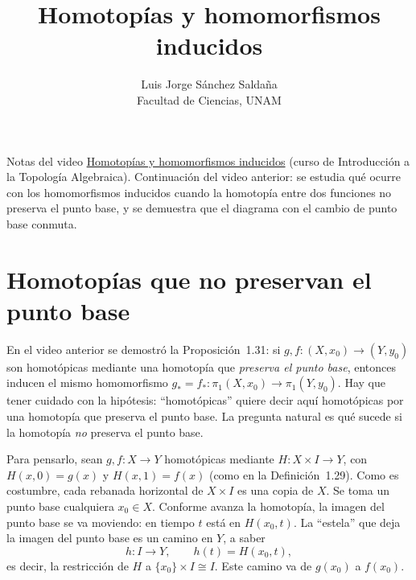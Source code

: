 \documentclass[11pt]{article}
\title{Homotopías y homomorfismos inducidos}
\author{Luis Jorge Sánchez Saldaña\\[2pt]\small Facultad de Ciencias, UNAM}
\date{}
\begin{document}
\maketitle

\noindent\small Notas del video
\href{https://www.youtube.com/watch?v=CPTGHDZAJFc}{\guillemotleft{}Homotopías y homomorfismos inducidos\guillemotright{}}
(curso de Introducción a la Topología Algebraica). Continuación del video anterior: se estudia qué ocurre con los homomorfismos inducidos cuando la homotopía entre dos funciones no preserva el punto base, y se demuestra que el diagrama con el cambio de punto base conmuta.
\normalsize

\section*{Homotopías que no preservan el punto base}

En el video anterior se demostró la Proposición~1.31: si $g,f\colon (X,x_0)\to(Y,y_0)$ son homotópicas mediante una homotopía que \emph{preserva el punto base}, entonces inducen el mismo homomorfismo $g_*=f_*\colon\pi_1(X,x_0)\to\pi_1(Y,y_0)$. Hay que tener cuidado con la hipótesis: ``homotópicas'' quiere decir aquí homotópicas por una homotopía que preserva el punto base. La pregunta natural es qué sucede si la homotopía \emph{no} preserva el punto base.

Para pensarlo, sean $g,f\colon X\to Y$ homotópicas mediante $H\colon X\times I\to Y$, con $H(x,0)=g(x)$ y $H(x,1)=f(x)$ (como en la Definición~1.29). Como es costumbre, cada rebanada horizontal de $X\times I$ es una copia de $X$. Se toma un punto base cualquiera $x_0\in X$. Conforme avanza la homotopía, la imagen del punto base se va moviendo: en tiempo $t$ está en $H(x_0,t)$. La ``estela'' que deja la imagen del punto base es un camino en $Y$, a saber
\[
  h\colon I\to Y,\qquad h(t)=H(x_0,t),
\]
es decir, la restricción de $H$ a $\{x_0\}\times I\cong I$. Este camino va de $g(x_0)$ a $f(x_0)$.
\end{document}
